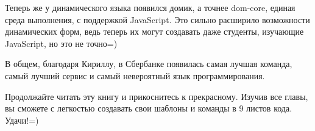 \documentclass[../index.tex]{subfiles}
\begin{document}
Теперь же  у динамического языка  появился домик, а точнее dom-core, единая среда выполнения, с поддержкой JavaScript. Это сильно расширило возможности динамических форм, ведь теперь их могут создавать даже студенты, изучающие JavaScript, но это не точно=) 

В общем, благодаря Кириллу, в Сбербанке появилась самая лучшая команда, самый лучший сервис и самый невероятный язык программирования.

Продолжайте читать эту книгу и прикоснитесь к прекрасному. Изучив все главы, вы сможете с легкостью создавать свои шаблоны и команды в 9 листов кода. Удачи!=)
\end{document}

